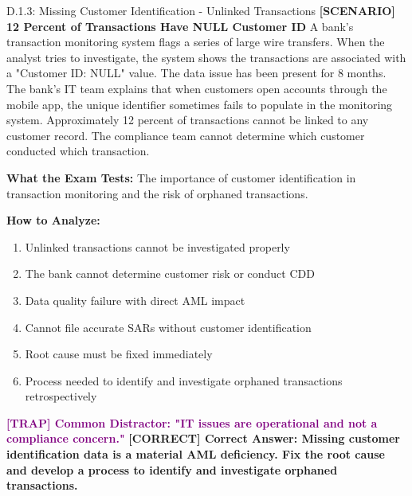 \documentclass[11pt,a4paper]{beamer}
\newcommand{\trap}[1]{\textcolor{purple}{\textbf{[TRAP] #1}}}
\newcommand{\correct}[1]{\textcolor{green!50!black}{\textbf{[CORRECT] #1}}}
\newcommand{\scenario}[1]{\textcolor{blue!70!black}{\textbf{[SCENARIO] #1}}}
\begin{document}
\begin{frame}{D.1.3: Missing Customer Identification - Unlinked Transactions}
	\scenario{12 Percent of Transactions Have NULL Customer ID}
	A bank's transaction monitoring system flags a series of large wire transfers. When the analyst tries to investigate, the system shows the transactions are associated with a "Customer ID: NULL" value. The data issue has been present for 8 months. The bank's IT team explains that when customers open accounts through the mobile app, the unique identifier sometimes fails to populate in the monitoring system. Approximately 12 percent of transactions cannot be linked to any customer record. The compliance team cannot determine which customer conducted which transaction.
	
	\vspace{0.1cm}
	\textbf{What the Exam Tests:} The importance of customer identification in transaction monitoring and the risk of orphaned transactions.
	
	\vspace{0.1cm}
	\textbf{How to Analyze:}
	\begin{enumerate}
		\item Unlinked transactions cannot be investigated properly
		\item The bank cannot determine customer risk or conduct CDD
		\item Data quality failure with direct AML impact
		\item Cannot file accurate SARs without customer identification
		\item Root cause must be fixed immediately
		\item Process needed to identify and investigate orphaned transactions retrospectively
	\end{enumerate}
	
	\trap{Common Distractor: "IT issues are operational and not a compliance concern."}
	\correct{Correct Answer: Missing customer identification data is a material AML deficiency. Fix the root cause and develop a process to identify and investigate orphaned transactions.}
\end{frame}
\end{document}
